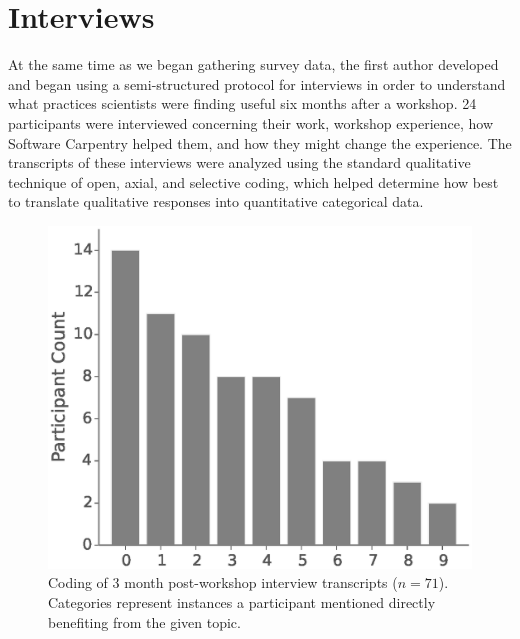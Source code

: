 \documentclass[10pt, twocolumn]{article}
\begin{document}
\section{Interviews}

At the same time as we began gathering survey data,
the first author developed and began using a semi-structured protocol for interviews
in order to understand what practices scientists were finding useful six months after a workshop.
24 participants were interviewed concerning their work,
workshop experience,
how Software Carpentry helped them,
and how they might change the experience.
The transcripts of these interviews were analyzed
using the standard qualitative technique of open, axial, and selective coding,
which helped determine how best to translate qualitative responses into quantitative categorical data.

\begin{figure}
\centering
\includegraphics[width=\linewidth]{figures/InterviewResponses}
\caption{
    Coding of 3 month post-workshop interview transcripts ($n=71$).
    Categories represent instances a participant mentioned
    directly benefiting from the given topic.
}
\label{InterviewResponses}
\end{figure}

\begin{figure}
    \end{figure}
\end{document}
